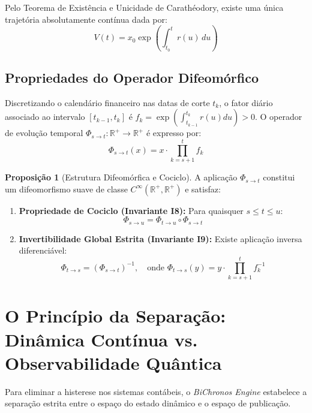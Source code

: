 \documentclass[11pt,a4paper]{article}
\theoremstyle{definition}
\newtheorem{proposition}[theorem]{Proposição}
\theoremstyle{remark}
\begin{document}
Pelo Teorema de Existência e Unicidade de Carathéodory, existe uma única trajetória absolutamente contínua dada por:
\begin{equation}
    V(t) = x_0 \exp\left( \int_{t_0}^t r(u) \, du \right)
\end{equation}

\subsection{Propriedades do Operador Difeomórfico}

Discretizando o calendário financeiro nas datas de corte $t_k$, o fator diário associado ao intervalo $[t_{k-1}, t_k]$ é $f_k = \exp\left( \int_{t_{k-1}}^{t_k} r(u) du \right) > 0$. O operador de evolução temporal $\Phi_{s \to t} : \mathbb{R}^+ \to \mathbb{R}^+$ é expresso por:
\begin{equation}
    \Phi_{s \to t}(x) = x \cdot \prod_{k=s+1}^{t} f_k
\end{equation}

\begin{proposition}[Estrutura Difeomórfica e Cociclo]
A aplicação $\Phi_{s \to t}$ constitui um difeomorfismo suave de classe $C^\infty(\mathbb{R}^+, \mathbb{R}^+)$ e satisfaz:
\begin{enumerate}
    \item \textbf{Propriedade de Cociclo (Invariante I8):} Para quaisquer $s \le t \le u$:
    \begin{equation}
        \Phi_{s \to u} = \Phi_{t \to u} \circ \Phi_{s \to t}
    \end{equation}
    \item \textbf{Invertibilidade Global Estrita (Invariante I9):} Existe aplicação inversa diferenciável:
    \begin{equation}
        \Phi_{t \to s} = (\Phi_{s \to t})^{-1}, \quad \text{onde } \Phi_{t \to s}(y) = y \cdot \prod_{k=s+1}^t f_k^{-1}
    \end{equation}
\end{enumerate}
\end{proposition}

\section{O Princípio da Separação: Dinâmica Contínua vs. Observabilidade Quântica}

Para eliminar a histerese nos sistemas contábeis, o \emph{BiChronos Engine} estabelece a separação estrita entre o espaço do estado dinâmico e o espaço de publicação.
\end{document}
